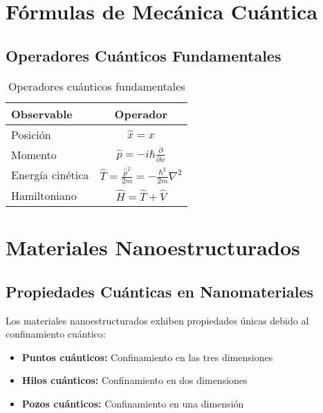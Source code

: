 \documentclass[12pt,a4paper,twoside]{book}
\begin{document}
	\chapter{Fórmulas de Mecánica Cuántica}
	
	\section{Operadores Cuánticos Fundamentales}
	
	\begin{table}[H]
		\centering
		\begin{tabular}{@{}lc@{}}
			\toprule
			\textbf{Observable} & \textbf{Operador} \\
			\midrule
			Posición & $\hat{x} = x$ \\
			Momento & $\hat{p} = -i\hbar \frac{\partial}{\partial x}$ \\
			Energía cinética & $\hat{T} = \frac{\hat{p}^2}{2m} = -\frac{\hbar^2}{2m}\nabla^2$ \\
			Hamiltoniano & $\hat{H} = \hat{T} + \hat{V}$ \\
			\bottomrule
		\end{tabular}
		\caption{Operadores cuánticos fundamentales}
	\end{table}
	
	\chapter{Materiales Nanoestructurados}
	
	\section{Propiedades Cuánticas en Nanomateriales}
	
	Los materiales nanoestructurados exhiben propiedades únicas debido al confinamiento cuántico:
	
	\begin{itemize}
		\item \textbf{Puntos cuánticos:} Confinamiento en las tres dimensiones
		\item \textbf{Hilos cuánticos:} Confinamiento en dos dimensiones
		\item \textbf{Pozos cuánticos:} Confinamiento en una dimensión
	\end{itemize}
	
\end{document}
